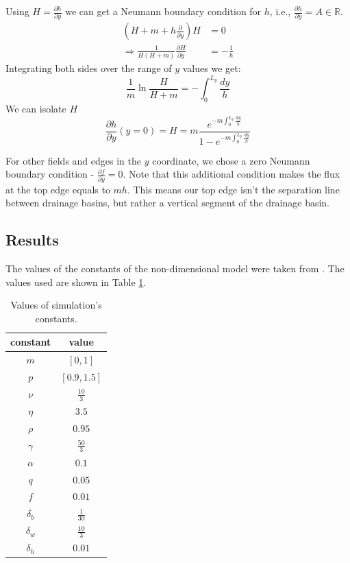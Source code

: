 \documentclass{article}
\numberwithin{equation}{section}
\begin{document}
Using $H=\frac{\partial h}{\partial y}$ we can get a Neumann boundary condition for $h$, i.e., $\frac{\partial h}{\partial y}=A\in \mathbb{R}$.
\begin{align}
    \left(H + m + h\frac{\partial}{\partial y}\right)H         & = 0             \\
    \Rightarrow \frac{1}{H(H+m)} \frac{\partial H}{\partial y} & = - \frac{1}{h}
\end{align}
Integrating both sides over the range of $y$ values we get:
\begin{equation}
    \frac{1}{m}\ln{\frac{H}{H+m}} = -\int_0^{L_y} \frac{dy}{h}
\end{equation}
We can isolate $H$
\begin{equation}
    \frac{\partial h}{\partial y} (y=0) = H = m \frac{e^{-m \int_0^{L_y} \frac{dy}{h}}}{1 - e^{-m \int_0^{L_y} \frac{dy}{h}}}
\end{equation}

For other fields and edges in the $y$ coordinate, we chose a zero Neumann boundary condition - $\frac{\partial f}{\partial y}=0$.
Note that this additional condition makes the flux at the top edge equals to $mh$.
This means our top edge isn't the separation line between drainage basins, but rather a vertical segment of the drainage basin.

\subsection{Results}
The values of the constants of the non-dimensional model were taken from \parencite[]{gilad_mathematical_2007}.
The values used are shown in Table  \ref{table:constants_tables}.
\begin{table}[!ht]
    \centering
    \begin{tabular}{||cc||}
        \hline
        constant   & value          \\
        \hline\hline
        $m$        & $[0, 1]$       \\
        $p$        & $[0.9, 1.5]$   \\
        $\nu$      & $\frac{10}{3}$ \\
        $\eta$     & $3.5$          \\
        $\rho$     & $0.95$         \\
        $\gamma$   & $\frac{50}{3}$ \\
        $\alpha$   & $0.1$          \\
        $q$        & $0.05$         \\
        $f$        & $0.01$         \\
        $\delta_b$ & $\frac{1}{30}$ \\
        $\delta_w$ & $\frac{10}{3}$ \\
        $\delta_h$ & $0.01$         \\
        \hline
    \end{tabular}
    \caption{Values of simulation's constants.}
    \label{table:constants_tables}
\end{table}
\end{document}
